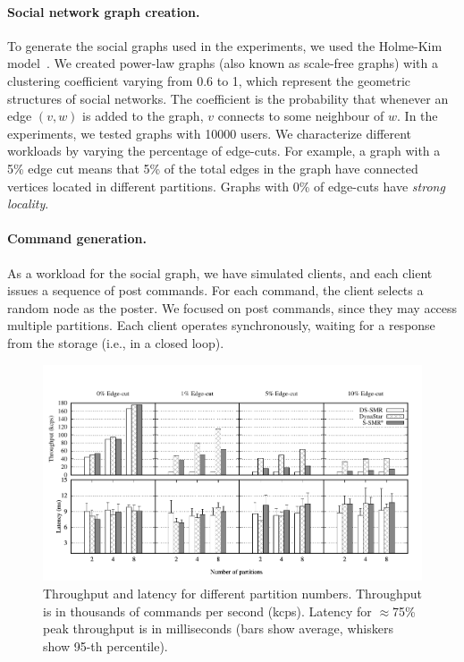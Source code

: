 \paragraph*{Social network graph creation.}
%
To generate the social graphs used in the experiments, we used the
Holme-Kim model~\cite{holme-kim}. We created power-law graphs (also
known as scale-free graphs) with a clustering coefficient varying from
0.6 to 1, which represent the geometric structures of social
networks. The coefficient is the probability that whenever an edge
$(v, w)$ is added to the graph, $v$ connects to some neighbour of $w$.
In the experiments, we tested graphs with 10000 users. We characterize
different workloads by varying the percentage of edge-cuts.  For
example, a graph with a 5\% edge cut means that 5\% of the total edges
in the graph have connected vertices located in different partitions.
Graphs with 0\% of edge-cuts have \emph{strong locality}.

\paragraph*{Command generation.}
%
As a workload for the social graph, we have simulated clients,
and each client issues a sequence of post
commands.  For each command, the client selects a random node as
the poster.  We focused on post commands, since they may access
multiple partitions. Each client operates synchronously,
waiting for a response from the storage (i.e., in a closed loop).

\begin{figure}[ht!]
	\includegraphics{figures/socc/socc-throughput-latency-avg-all}
	\caption{Throughput and latency for different partition numbers. 
  Throughput is in thousands of commands per second (kcps). 
  Latency for $\approx$75\% peak throughput is in milliseconds (bars show average, whiskers show 95-th percentile).}
	\label{fig:varying_edge_cut}
\end{figure}



